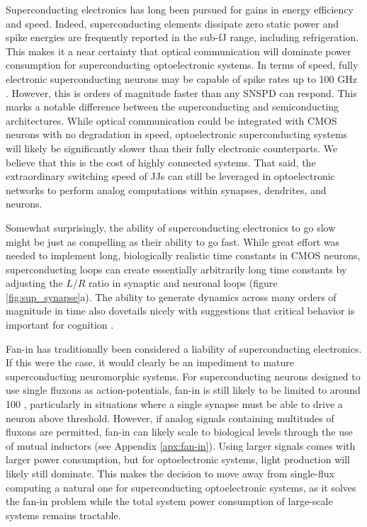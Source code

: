 \documentclass[twocolumn]{article}
\begin{document}
Superconducting electronics has long been pursued for gains in energy efficiency and speed. Indeed, superconducting elements dissipate zero static power and spike energies are frequently reported in the sub-fJ range, including refrigeration. This makes it a near certainty that optical communication will dominate power consumption for superconducting optoelectronic systems. In terms of speed, fully electronic superconducting neurons may be capable of spike rates up to 100 GHz \cite{schneider2018tutorial, schneider2017energy}. However, this is orders of magnitude faster than any SNSPD can respond. This marks a notable difference between the superconducting and semiconducting architectures. While optical communication could be integrated with CMOS neurons with no degradation in speed, optoelectronic superconducting systems will likely be significantly slower than their fully electronic counterparts. We believe that this is the cost of highly connected systems. That said, the extraordinary switching speed of JJs can still be leveraged in optoelectronic networks to perform analog computations within synapses, dendrites, and neurons.

Somewhat surprisingly, the ability of superconducting electronics to go slow might be just as compelling as their ability to go fast. While great effort was needed to implement long, biologically realistic time constants in CMOS neurons, superconducting loops can create essentially arbitrarily long time constants by adjusting the $L/R$ ratio in synaptic and neuronal loops (figure \ref{fig:sup_synapse}a). The ability to generate dynamics across many orders of magnitude in time also dovetails nicely with suggestions that critical behavior is important for cognition \cite{cocchi2017criticality}. 

Fan-in has traditionally been considered a liability of superconducting electronics. If this were the case, it would clearly be an impediment to mature superconducting neuromorphic systems. For superconducting neurons designed to use single fluxons as action-potentials, fan-in is still likely to be limited to around 100 \cite{schneider2020fan}, particularly in situations where a single synapse must be able to drive a neuron above threshold. However, if analog signals containing multitudes of fluxons are permitted, fan-in can likely scale to biological levels through the use of mutual inductors (see Appendix \ref{apx:fan-in}). Using larger signals comes with larger power consumption, but for optoelectronic systems, light production will likely still dominate. This makes the decision to move away from single-flux computing a natural one for superconducting optoelectronic systems, as it solves the fan-in problem while the total system power consumption of large-scale systems remains tractable.
\end{document}
